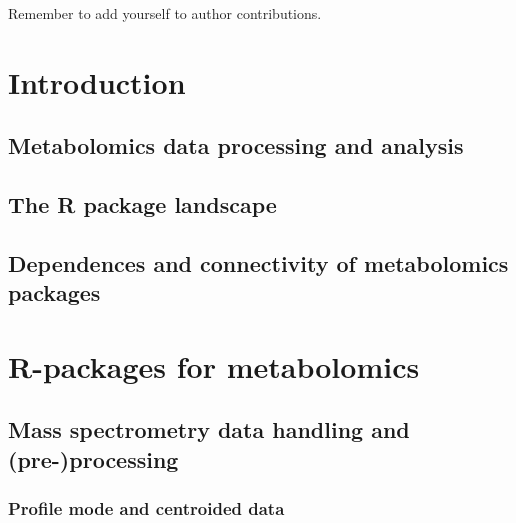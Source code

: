 \documentclass[]{article}
\begin{document}
Remember to add yourself to author contributions.

\newpage

\hypertarget{introduction}{%
\section{Introduction}\label{introduction}}

\newpage

\hypertarget{metabolomics-data-processing-and-analysis}{%
\subsection{Metabolomics data processing and analysis}\label{metabolomics-data-processing-and-analysis}}

\newpage

\hypertarget{the-r-package-landscape}{%
\subsection{The R package landscape}\label{the-r-package-landscape}}

\newpage

\hypertarget{dependences-and-connectivity-of-metabolomics-packages}{%
\subsection{Dependences and connectivity of metabolomics packages}\label{dependences-and-connectivity-of-metabolomics-packages}}

\newpage

\hypertarget{r-packages-for-metabolomics}{%
\section{R-packages for metabolomics}\label{r-packages-for-metabolomics}}

\newpage

\hypertarget{mass-spectrometry-data-handling-and-pre-processing}{%
\subsection{Mass spectrometry data handling and (pre-)processing}\label{mass-spectrometry-data-handling-and-pre-processing}}

\hypertarget{profile-mode-and-centroided-data}{%
\subsubsection{Profile mode and centroided data}\label{profile-mode-and-centroided-data}}
\end{document}
